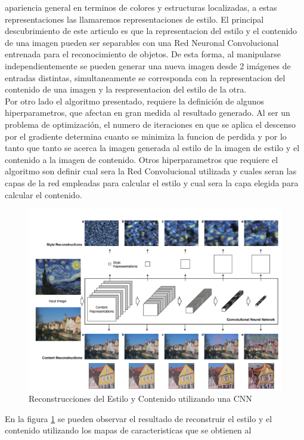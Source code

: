 \documentclass[a4paper,11pt,spanish]{book}
\begin{document}
      apariencia general en terminos de colores y estructuras localizadas, a estas representaciones las llamaremos representaciones de estilo.
      El principal descubrimiento de este articulo es que la representacion del estilo y el contenido de una imagen pueden ser separables con una Red Neuronal Convolucional entrenada
      para el reconocimiento de objetos. De esta forma, al manipularse independientemente se pueden generar una nueva imagen desde 2 imágenes de entradas distintas, simultaneamente se corresponda con la representacion
      del contenido de una imagen y la respresentacion del estilo de la otra.\\
      Por otro lado el algoritmo presentado, requiere la definición de algunos hiperparametros, que afectan en gran medida al resultado generado.
      Al ser un problema de optimización, el numero de iteraciones en que se aplica el descenso por el gradiente determina cuanto se minimiza la funcion de perdida
      y por lo tanto que tanto se acerca la imagen generada al estilo de la imagen de estilo y el contenido a la imagen de contenido.
      Otros hiperparametros que requiere el algoritmo son definir cual sera la Red Convolucional utilizada y cuales seran las capas de la red empleadas para calcular el estilo y cual sera la capa elegida
      para calcular el contenido.
      	  \begin{figure}[h]
	    \includegraphics[width=\textwidth]{./img/gatys_1.png}
	    \caption{Reconstrucciones del Estilo y Contenido utilizando una CNN}
	    \label{fig:gatys_reconstrucciones}
	  \end{figure}
      En la figura \ref{fig:gatys_reconstrucciones} se pueden observar el resultado de reconstruir el estilo y el contenido utilizando los mapas de caracteristicas que se obtienen al
\end{document}
